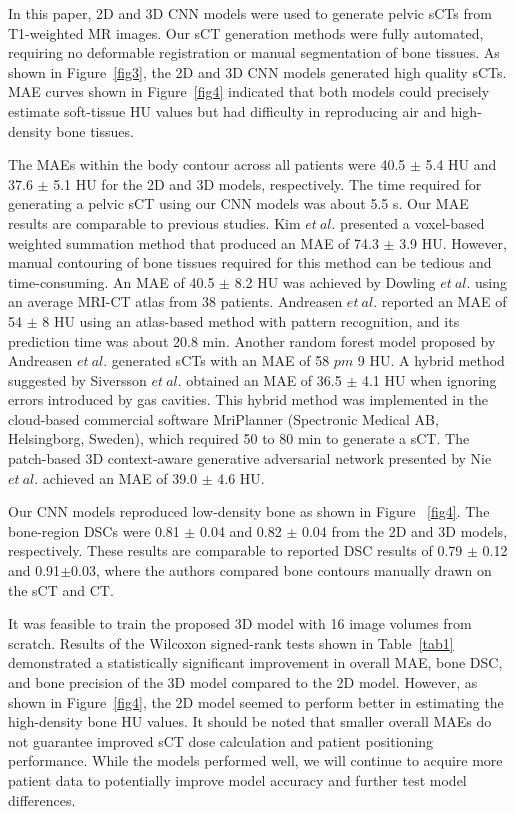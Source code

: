 In this paper, 2D and 3D CNN models were used to generate pelvic sCTs from T1-weighted MR images. Our sCT generation methods were fully automated, requiring no deformable registration or manual segmentation of bone tissues. As shown in Figure~\ref{fig3}, the 2D and 3D CNN models generated high quality sCTs. MAE curves shown in Figure~\ref{fig4} indicated that both models could precisely estimate soft-tissue HU values but had difficulty in reproducing air and high-density bone tissues. 

The MAEs within the body contour across all patients were 40.5 $\pm$ 5.4 HU and 37.6 $\pm$ 5.1 HU for the 2D and 3D models, respectively. The time required for generating a pelvic sCT using our CNN models was about 5.5 s. Our MAE results are comparable to previous studies. Kim $et \ al.$\cite{RN41} presented a voxel-based weighted summation method that produced an MAE of 74.3 $\pm$ 3.9 HU. However, manual contouring of bone tissues required for this method can be tedious and time-consuming. An MAE of 40.5 $\pm$ 8.2 HU was achieved by Dowling $et \ al.$\cite{RN11} using an average MRI-CT atlas from 38 patients. Andreasen $et \ al.$\cite{RN42} reported an MAE of 54 $\pm$ 8 HU using an atlas-based method with pattern recognition, and its prediction time was about 20.8 min. Another random forest model proposed by Andreasen $et \ al.$\cite{RN43} generated sCTs with an MAE of 58 $pm$ 9 HU. A hybrid method suggested by Siversson $et \ al.$ \cite{RN45} obtained an MAE of 36.5 $\pm$ 4.1 HU when ignoring errors introduced by gas cavities. This hybrid method was implemented in the cloud-based commercial software MriPlanner (Spectronic Medical AB, Helsingborg, Sweden), which required 50 to 80 min to generate a sCT.\cite{RN45} The patch-based 3D context-aware generative adversarial network presented by Nie $et \ al.$\cite{RN26} achieved an MAE of 39.0 $\pm$ 4.6 HU. 

Our CNN models reproduced low-density bone as shown in Figure ~\ref{fig4}. The bone-region DSCs were 0.81 $\pm$ 0.04 and 0.82 $\pm$ 0.04 from the 2D and 3D models, respectively. These results are comparable to reported DSC results of 0.79 $\pm$ 0.12\cite{RN10} and 0.91$\pm$0.03{\cite{RN11}}, where the authors compared bone contours manually drawn on the sCT and CT.

It was feasible to train the proposed 3D model with 16 image volumes from scratch. Results of the Wilcoxon signed-rank tests shown in Table~\ref{tab1} demonstrated a statistically significant improvement in overall MAE, bone DSC, and bone precision of the 3D model compared to the 2D model. However, as shown in Figure~\ref{fig4}, the 2D model seemed to perform better in estimating the high-density bone HU values. It should be noted that smaller overall MAEs do not guarantee improved sCT dose calculation and patient positioning performance. While the models performed well, we will continue to acquire more patient data to potentially improve model accuracy and further test model differences.

